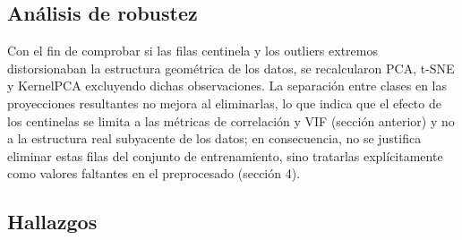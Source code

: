 \documentclass[11pt,a4paper]{article}
\begin{document}
\subsection{An\'alisis de robustez}

Con el fin de comprobar si las filas centinela y los outliers extremos distorsionaban la estructura geom\'etrica de los datos, se recalcularon PCA, t-SNE y KernelPCA excluyendo dichas observaciones. La separaci\'on entre clases en las proyecciones resultantes no mejora al eliminarlas, lo que indica que el efecto de los centinelas se limita a las m\'etricas de correlaci\'on y VIF (secci\'on anterior) y no a la estructura real subyacente de los datos; en consecuencia, no se justifica eliminar estas filas del conjunto de entrenamiento, sino tratarlas expl\'icitamente como valores faltantes en el preprocesado (secci\'on 4).

\subsection*{Hallazgos}
\end{document}

